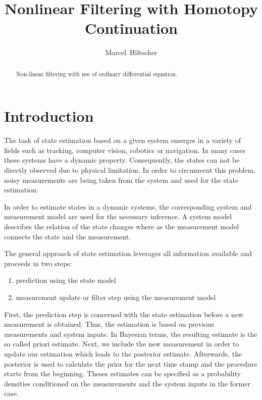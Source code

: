 \documentclass[a4paper]{IEEEtran}
\title{Nonlinear Filtering with Homotopy Continuation}
\author{Marcel~Hiltscher}
\begin{document}
\maketitle

\begin{abstract}
Non-linear filtering with use of ordinary differential equation.
\end{abstract}

\section{Introduction}
\label{ch:intro}

The task of state estimation based on a given system emerges in a variety of fields such as tracking, computer vision, robotics or navigation.
In many cases these systems have a dynamic property. Consequently, the states can not be directly observed due to physical limitation. In order to 
circumvent this problem, noisy measurements are being taken from the system and used for the state estimation. 

In order to estimate states in a dynamic systems, the corresponding system and measurement model are used for the necessary inference. A system model describes the relation of the state changes where as the measurement
model connects the state and the measurement.

The general approach of state estimation leverages all information available and proceeds in two steps:
\begin{enumerate}
    \item prediction using the state model
    \item measurement update or filter step using the measurement model
\end{enumerate}

First, the prediction step is concerned with the state estimation before a new measurement is obtained. Thus, the estimation is based on previous measurements and system inputs.
In Bayesian terms, the resulting estimate is the so called priori estimate. Next, we include the new measurement in order to update our estimation which leads to the posterior estimate. 
Afterwards, the posterior is used to calculate the prior for the next time stamp and the procedure starts from the beginning. Theses estimates can be specified as a probability densities conditioned 
on the measurements and the system inputs in the former case.
\end{document}
